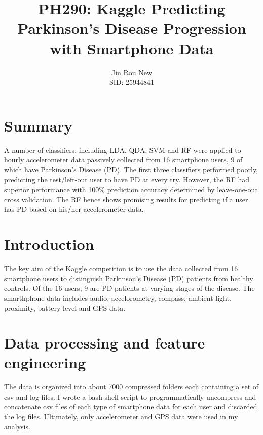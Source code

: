 \documentclass[8pt]{article}
\title{PH290: Kaggle Predicting Parkinson's Disease Progression\\with Smartphone Data}
\author{Jin Rou New\\
	SID: 25944841
	}
\date{\vspace{-5ex}} %
\begin{document}
\maketitle
%
\section{Summary}
\label{sec:summary}
A number of classifiers, including LDA, QDA, SVM and RF were applied to hourly accelerometer data passively collected from 16 smartphone users, 9 of which have Parkinson's Disease (PD). The first three classifiers performed poorly, predicting the test/left-out user to have PD at every try. However, the RF had superior performance with 100\% prediction accuracy determined by leave-one-out cross validation. The RF hence shows promising results for predicting if a user has PD based on his/her accelerometer data.
\section{Introduction}
\label{sec:introduction}
The key aim of the Kaggle competition is to use the data collected from 16 smartphone users to distinguish Parkinson's Disease (PD) patients from healthy controls. Of the 16 users, 9 are PD patients at varying stages of the disease. The smarthphone data includes audio, accelorometry, compass, ambient light, proximity, battery level and GPS data.
\section{Data processing and feature engineering} 
\label{sec:data-processing}
The data is organized into about 7000 compressed folders each containing a set of csv and log files. I wrote a bash shell script to programmatically uncompress and concatenate csv files of each type of smartphone data for each user and discarded the log files. Ultimately, only accelerometer and GPS data were used in my analysis.
\end{document}
